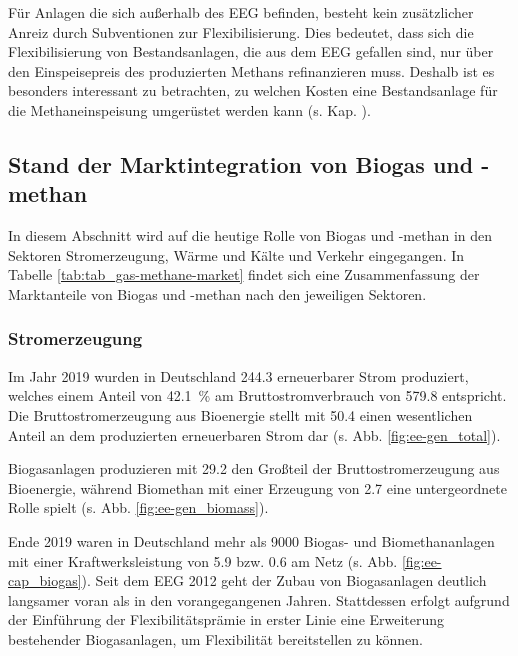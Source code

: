 Für Anlagen die sich außerhalb des \gls{EEG} befinden, besteht kein zusätzlicher Anreiz durch Subventionen zur Flexibilisierung. Dies bedeutet, dass sich die Flexibilisierung von Bestandsanlagen, die aus dem \gls{EEG} gefallen sind, nur über den Einspeisepreis des produzierten Methans refinanzieren muss. Deshalb ist es besonders interessant zu betrachten, zu welchen Kosten eine Bestandsanlage für die Methaneinspeisung umgerüstet werden kann (s. Kap. ). %

\subsection{Stand der Marktintegration von Biogas und -methan}

In diesem Abschnitt wird auf die heutige Rolle von Biogas und -methan in den Sektoren Stromerzeugung, Wärme und Kälte und Verkehr eingegangen. In Tabelle \ref{tab:tab_gas-methane-market} findet sich eine Zusammenfassung der Marktanteile von Biogas und -methan nach den jeweiligen Sektoren.




\subsubsection{Stromerzeugung}

Im Jahr 2019 wurden in Deutschland \SI{244.3}{\twh} erneuerbarer Strom produziert, welches einem Anteil von \SI{42.1}{\percent} am Bruttostromverbrauch von \SI{579.8}{\twh} entspricht. Die Bruttostromerzeugung aus Bioenergie stellt mit \SI{50.4}{\twh} einen wesentlichen Anteil an dem produzierten erneuerbaren Strom dar (s. Abb. \ref{fig:ee-gen_total}). \parencite{BWE2020} 



Biogasanlagen produzieren mit \SI{29.2}{\twh} den Großteil der Bruttostromerzeugung aus Bioenergie, während Biomethan mit einer Erzeugung von \SI{2.7}{\twh} eine untergeordnete Rolle spielt (s. Abb. \ref{fig:ee-gen_biomass}). \parencite{BWE2020} 



Ende 2019 waren in Deutschland mehr als \SI{9000}{\relax} Biogas- und Biomethananlagen mit einer Kraftwerksleistung von \SI{5.9}{\gw} bzw. \SI{0.6}{\gw} am Netz (s. Abb. \ref{fig:ee-cap_biogas}). Seit dem \gls{EEG} \SI{2012}{\relax} geht der Zubau von Biogasanlagen deutlich langsamer voran als in den vorangegangenen Jahren. Stattdessen erfolgt aufgrund der Einführung der Flexibilitätsprämie in erster Linie eine Erweiterung bestehender Biogasanlagen, um Flexibilität bereitstellen zu können. \parencite{BWE2020} \parencite{DanielGromke2019}

